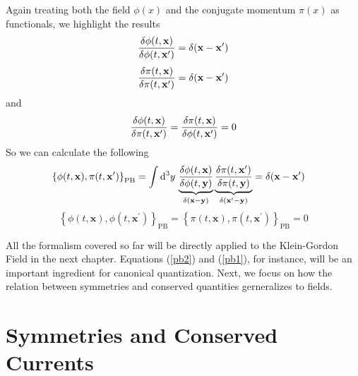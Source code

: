 Again treating both the field $\phi(x)$ and the conjugate momentum $\pi(x)$ as functionals, we highlight the results
 \begin{equation}
     \fdv{\phi(t,\vb{x})}{\phi(t,\vb{x}^\prime)}=\delta(\vb{x}-\vb{x}^\prime)
 \end{equation}
  \begin{equation}
     \fdv{\pi(t,\vb{x})}{\pi(t,\vb{x}^\prime)}=\delta(\vb{x}-\vb{x}^\prime)
 \end{equation}
 and
 \begin{equation}
     \fdv{\phi(t,\vb{x})}{\pi(t,\vb{x}^\prime)}= \fdv{\pi(t,\vb{x})}{\phi(t,\vb{x}^\prime)}=0
 \end{equation}
 So we can calculate the following
 \begin{equation}
\begin{aligned}
    \poissonbracket{\phi(t,\vb{x})}{\pi(t,\vb{x}^\prime)}_{\text{PB}}&=\int\dd^3y\,\underbrace{\fdv{\phi(t,\vb{x})}{\phi(t,\vb{y})}}_{\delta(\vb{x}-\vb{y})}\underbrace{\fdv{\pi(t,\vb{x}^\prime)}{\pi(t,\vb{y})}}_{\delta(\vb{x}^\prime-\vb{y})}=\delta(\vb{x}-\vb{x}^\prime)
    \label{pb2}
\end{aligned}
\end{equation}
\begin{equation}
\left\{\phi(t, \mathbf{x}), \phi\left(t, \mathbf{x}^{\prime}\right)\right\}_{\mathrm{PB}}=\left\{\pi(t, \mathbf{x}), \pi\left(t, \mathbf{x}^{\prime}\right)\right\}_{\mathrm{PB}}=0
\label{pb1}
\end{equation}
 
 All the formalism covered so far will be directly applied to the Klein-Gordon Field in the next chapter. Equations (\ref{pb2}) and (\ref{pb1}), for instance, will be an important ingredient for canonical quantization. Next, we focus on how the relation between symmetries and conserved quantities gerneralizes to fields.
\section{Symmetries and Conserved Currents}
